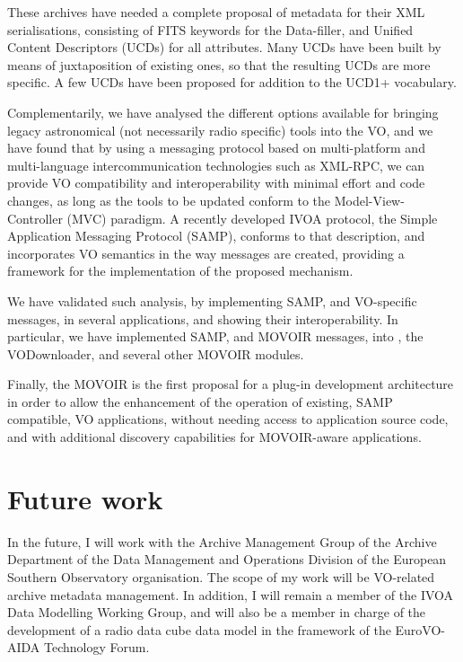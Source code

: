 	These archives have needed a complete proposal of metadata
	for their XML serialisations, consisting of FITS keywords
	for the Data-filler, and Unified Content Descriptors (UCDs)
	for all attributes. Many UCDs have been built by means of
	juxtaposition of existing ones, so that the resulting
	UCDs are more specific. A few UCDs have been proposed for
	addition to the UCD1+ vocabulary.
	
	Complementarily, we have analysed the different options
	available for bringing legacy astronomical (not necessarily
	radio specific) tools into the VO, and we have found that
	by using a messaging protocol based on multi-platform and
	multi-language intercommunication technologies such as 
	XML-RPC, we can provide VO compatibility and interoperability
	with minimal effort and code changes, as long as the tools
	to be updated conform to the Model-View-Controller (MVC)
	paradigm. A recently developed IVOA protocol, the
	Simple Application Messaging Protocol (SAMP), conforms to
	that description, and incorporates VO semantics in the way
	messages are created, providing a framework for the
	implementation of the proposed mechanism.
	
	We have validated such analysis, by implementing SAMP, and
	VO-specific messages, in several applications, and showing
	their interoperability. In particular, we have implemented
	SAMP, and MOVOIR messages, into \massa{}, the VODownloader, and
	several other MOVOIR modules.
	
	Finally, the MOVOIR is the first proposal for a plug-in
	development architecture in order to allow the enhancement of
	the operation of existing, SAMP compatible, VO applications,
	without needing access to application source code, and with
	additional discovery capabilities for MOVOIR-aware applications.
	
	\section*{Future work} %
	\label{sec:future_work}
		
		In the future, I will work with the Archive Management
		Group of the Archive Department of the Data Management and
		Operations Division of the European Southern
		Observatory organisation. The scope of my work will be
		VO-related archive metadata
		management. In addition, I will remain a member of
		the IVOA Data Modelling Working Group, and will also be
		a member in charge of the development of a radio data
		cube data model in the framework of the EuroVO-AIDA
		Technology Forum.
		

